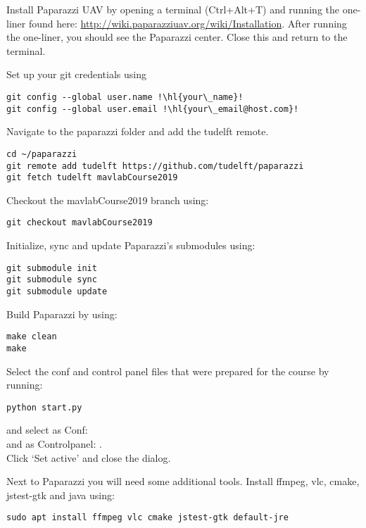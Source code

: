 \documentclass{article}
\begin{document}
\begin{enumerate}
\item{Install Paparazzi UAV by opening a terminal (Ctrl+Alt+T) and running the one-liner found here: \url{http://wiki.paparazziuav.org/wiki/Installation}. After running the one-liner, you should see the Paparazzi center. Close this and return to the terminal.}
\item{Set up your git credentials using
\begin{lstlisting}[style=Bash]
git config --global user.name !\hl{your\_name}!
git config --global user.email !\hl{your\_email@host.com}!
\end{lstlisting}}
\item{Navigate to the paparazzi folder and add the tudelft remote.
\begin{lstlisting}[style=Bash]
cd ~/paparazzi
git remote add tudelft https://github.com/tudelft/paparazzi
git fetch tudelft mavlabCourse2019
\end{lstlisting}
}
\item{Checkout the mavlabCourse2019 branch using:
\begin{lstlisting}[style=Bash]
git checkout mavlabCourse2019
\end{lstlisting}
}
\item{Initialize, sync and update Paparazzi's submodules using:
\begin{lstlisting}[style=Bash]
git submodule init
git submodule sync
git submodule update
\end{lstlisting}
}
\item{Build Paparazzi by using:
\begin{lstlisting}[style=Bash]
make clean
make
\end{lstlisting}
\item{Select the conf and control panel files that were prepared for the course by running:
\begin{lstlisting}[style=Bash]
python start.py
\end{lstlisting}
and select as Conf: \\
and as Controlpanel: .\\
Click `Set active' and close the dialog.}
\item{Next to Paparazzi you will need some additional tools. Install ffmpeg, vlc, cmake, jstest-gtk and java using:
\begin{lstlisting}[style=Bash]
sudo apt install ffmpeg vlc cmake jstest-gtk default-jre

\end{lstlisting}}}
\end{enumerate}
\end{document}
